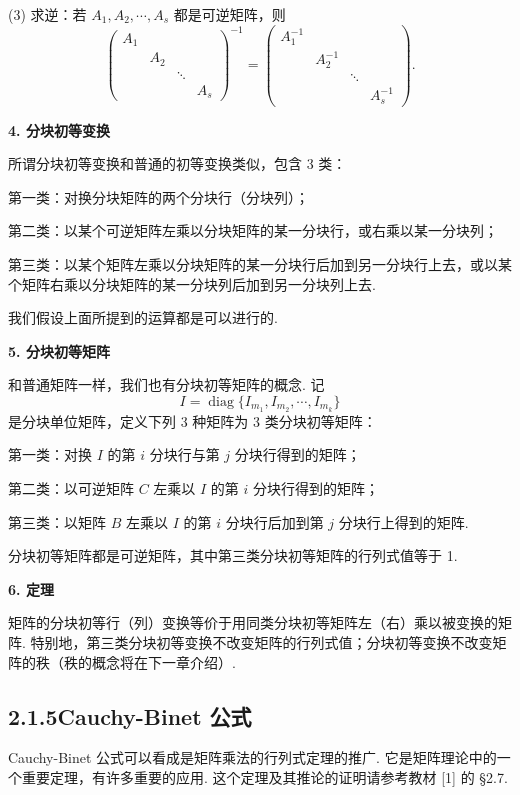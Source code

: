 \documentclass[UTF8, 12pt, fontset=fandol, oneside]{ctexart}
\begin{document}
(3) 求逆：若 $A_1,A_2,\cdots,A_s$ 都是可逆矩阵，则
\[
\left(
\begin{array}{cccc}
A_1 & & &\\
& A_2 & &\\
& & \ddots &\\
& & & A_s
\end{array}
\right)^{-1}
=
\left(
\begin{array}{cccc}
A_1^{-1} & & &\\
& A_2^{-1} & &\\
& & \ddots &\\
& & & A_s^{-1}
\end{array}
\right).
\]

\noindent\textbf{4. 分块初等变换}

所谓分块初等变换和普通的初等变换类似，包含 3 类：

第一类：对换分块矩阵的两个分块行（分块列）；

第二类：以某个可逆矩阵左乘以分块矩阵的某一分块行，或右乘以某一分块列；

第三类：以某个矩阵左乘以分块矩阵的某一分块行后加到另一分块行上去，或以某个矩阵右乘以分块矩阵的某一分块列后加到另一分块列上去.

我们假设上面所提到的运算都是可以进行的.

\noindent\textbf{5. 分块初等矩阵}

和普通矩阵一样，我们也有分块初等矩阵的概念. 记
\[
I=\operatorname{diag}\{I_{m_1},I_{m_2},\cdots,I_{m_k}\}
\]
是分块单位矩阵，定义下列 3 种矩阵为 3 类分块初等矩阵：

第一类：对换 $I$ 的第 $i$ 分块行与第 $j$ 分块行得到的矩阵；

第二类：以可逆矩阵 $C$ 左乘以 $I$ 的第 $i$ 分块行得到的矩阵；

第三类：以矩阵 $B$ 左乘以 $I$ 的第 $i$ 分块行后加到第 $j$ 分块行上得到的矩阵.

分块初等矩阵都是可逆矩阵，其中第三类分块初等矩阵的行列式值等于 1.

\noindent\textbf{6. 定理}

矩阵的分块初等行（列）变换等价于用同类分块初等矩阵左（右）乘以被变换的矩阵. 特别地，第三类分块初等变换不改变矩阵的行列式值；分块初等变换不改变矩阵的秩（秩的概念将在下一章介绍）.

\subsection*{2.1.5\quad Cauchy-Binet 公式}

Cauchy-Binet 公式可以看成是矩阵乘法的行列式定理的推广. 它是矩阵理论中的一个重要定理，有许多重要的应用. 这个定理及其推论的证明请参考教材 [1] 的 §2.7.
\end{document}
